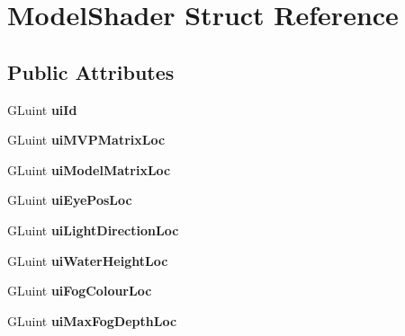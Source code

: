 \hypertarget{struct_model_shader}{\section{Model\+Shader Struct Reference}
\label{struct_model_shader}
}
\subsection*{Public Attributes}
\begin{DoxyCompactItemize}
\item 
\hypertarget{struct_model_shader_a0b90ce899ad7723cfc23c5eec262034d}{G\+Luint {\bfseries ui\+Id}}\label{struct_model_shader_a0b90ce899ad7723cfc23c5eec262034d}

\item 
\hypertarget{struct_model_shader_ace9d557cac00f0f502a1463d157be0fa}{G\+Luint {\bfseries ui\+M\+V\+P\+Matrix\+Loc}}\label{struct_model_shader_ace9d557cac00f0f502a1463d157be0fa}

\item 
\hypertarget{struct_model_shader_acea356501252765049deb1c9fda3c5a7}{G\+Luint {\bfseries ui\+Model\+Matrix\+Loc}}\label{struct_model_shader_acea356501252765049deb1c9fda3c5a7}

\item 
\hypertarget{struct_model_shader_a863e285308e8806e4cdb25fd5bf51adf}{G\+Luint {\bfseries ui\+Eye\+Pos\+Loc}}\label{struct_model_shader_a863e285308e8806e4cdb25fd5bf51adf}

\item 
\hypertarget{struct_model_shader_a2fea1bc56539f390e6a70bca7110c961}{G\+Luint {\bfseries ui\+Light\+Direction\+Loc}}\label{struct_model_shader_a2fea1bc56539f390e6a70bca7110c961}

\item 
\hypertarget{struct_model_shader_afcdaf37131de0892cb4e0267dcb45bd6}{G\+Luint {\bfseries ui\+Water\+Height\+Loc}}\label{struct_model_shader_afcdaf37131de0892cb4e0267dcb45bd6}

\item 
\hypertarget{struct_model_shader_adecb0ef3bf7dd3ccfcc978e380dc58db}{G\+Luint {\bfseries ui\+Fog\+Colour\+Loc}}\label{struct_model_shader_adecb0ef3bf7dd3ccfcc978e380dc58db}

\item 
\hypertarget{struct_model_shader_a4a8e1cbb29a466751e3226e00e6df5b3}{G\+Luint {\bfseries ui\+Max\+Fog\+Depth\+Loc}}\label{struct_model_shader_a4a8e1cbb29a466751e3226e00e6df5b3}


\end{DoxyCompactItemize}
